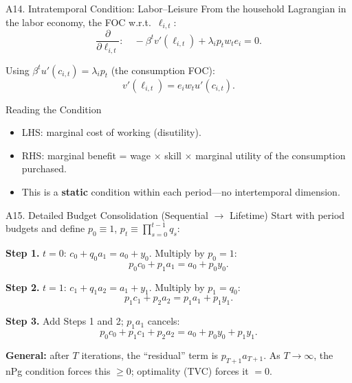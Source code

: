 \documentclass[aspectratio=169,10pt]{beamer}
\newcommand{\backbutton}[1]{\hfill\hyperlink{#1}{\beamerbutton{Back}}}
\begin{document}
\begin{frame}{A14. Intratemporal Condition: Labor--Leisure}
\hypertarget{a14}{}
From the household Lagrangian in the labor economy, the FOC w.r.t.\ $\ell_{i,t}$:
\[
\frac{\partial}{\partial \ell_{i,t}}: \quad -\beta^t v'(\ell_{i,t}) + \lambda_i p_t w_t e_i = 0.
\]

Using $\beta^t u'(c_{i,t})=\lambda_i p_t$ (the consumption FOC):
\[
v'(\ell_{i,t}) = e_i w_t u'(c_{i,t}).
\]

\begin{block}{Reading the Condition}
\begin{itemize}
  \item LHS: marginal cost of working (disutility).
  \item RHS: marginal benefit = wage $\times$ skill $\times$ marginal utility of the consumption purchased.
  \item This is a \textbf{static} condition within each period---no intertemporal dimension.
\end{itemize}
\end{block}
\backbutton{m-labor-foc}
\end{frame}

\begin{frame}{A15. Detailed Budget Consolidation (Sequential $\to$ Lifetime)}
\hypertarget{a15}{}
\small
Start with period budgets and define $p_0\equiv 1$, $p_t\equiv\prod_{s=0}^{t-1}q_s$:

\textbf{Step 1.} $t=0$: $c_0+q_0 a_1 = a_0+y_0$. Multiply by $p_0=1$:
\[
p_0 c_0 + p_1 a_1 = a_0 + p_0 y_0.
\]

\textbf{Step 2.} $t=1$: $c_1+q_1 a_2=a_1+y_1$. Multiply by $p_1=q_0$:
\[
p_1 c_1 + p_2 a_2 = p_1 a_1 + p_1 y_1.
\]

\textbf{Step 3.} Add Steps 1 and 2; $p_1 a_1$ cancels:
\[
p_0 c_0 + p_1 c_1 + p_2 a_2 = a_0 + p_0 y_0 + p_1 y_1.
\]

\textbf{General:} after $T$ iterations, the ``residual'' term is $p_{T+1}a_{T+1}$. As $T\to\infty$, the nPg condition forces this $\geq 0$; optimality (TVC) forces it $=0$.
\normalsize
\backbutton{m-budget-collapse}
\end{frame}
\end{document}
